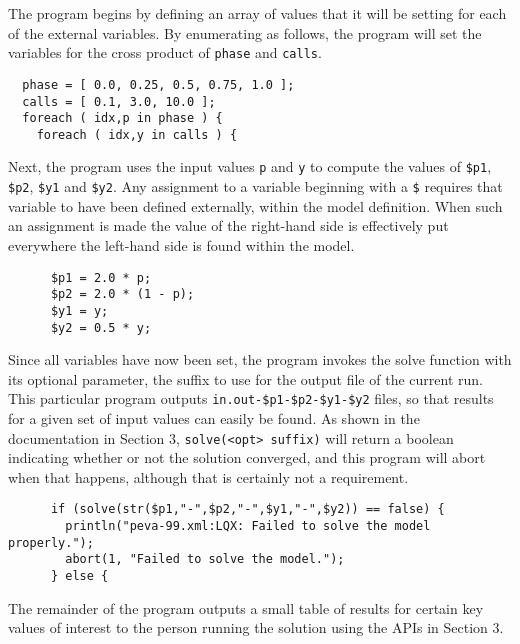 The program begins by defining an array of values that it will be setting for each of
the external variables. By enumerating as follows, the program will set the variables
for the cross product of {\tt phase} and {\tt calls}.

\lstset{language=LQX}
\lstset{name=lqx-program}
\begin{lstlisting}
  phase = [ 0.0, 0.25, 0.5, 0.75, 1.0 ];
  calls = [ 0.1, 3.0, 10.0 ];
  foreach ( idx,p in phase ) {
    foreach ( idx,y in calls ) {
    \end{lstlisting}

    Next, the program uses the input values {\tt p} and {\tt y} to compute the values of
    {\tt \$p1}, {\tt \$p2}, {\tt \$y1} and {\tt \$y2}. Any assignment to a variable
    beginning with a {\tt \$} requires that variable to have been defined externally,
    within the model definition. When such an assignment is made the value of the right-hand
    side is effectively put everywhere the left-hand side is found within the model.

    \lstset{ firstnumber= 5  }
    \begin{lstlisting}
      $p1 = 2.0 * p;
      $p2 = 2.0 * (1 - p);
      $y1 = y;
      $y2 = 0.5 * y;
    \end{lstlisting}

    Since all variables have now been set, the program invokes the solve function with
    its optional parameter, the suffix to use for the output file of the current run.
    This particular program outputs {\tt in.out-\$p1-\$p2-\$y1-\$y2} files, so that
    results for a given set of input values can easily be found. As shown in the
    documentation in Section 3, {\tt solve(<opt> suffix)} will return a boolean
    indicating whether or not the solution converged, and this program will abort
    when that happens, although that is certainly not a requirement.

    \lstset{ firstnumber=9}
    \begin{lstlisting}
      if (solve(str($p1,"-",$p2,"-",$y1,"-",$y2)) == false) {
        println("peva-99.xml:LQX: Failed to solve the model properly.");
        abort(1, "Failed to solve the model.");
      } else {
      \end{lstlisting}

      The remainder of the program outputs a small table of results for certain key
      values of interest to the person running the solution using the APIs in Section 3.

